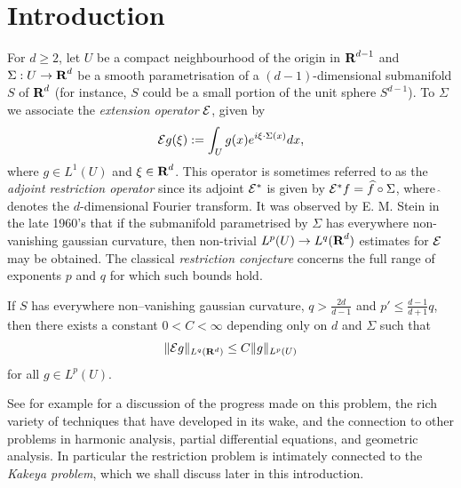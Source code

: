 \section{Introduction}
For $d\geq 2$, let $U$ be a compact neighbourhood of the origin in
${\hbox{\bf R}}^{d-1}$ and $\Sigma :U\rightarrow {\hbox{\bf R}}^{d}$ be a smooth
parametrisation of a $(d-1)$-dimensional submanifold $S$ of
${\hbox{\bf R}}^d$ (for instance, $S$ could be a small portion of the unit sphere $S^{d-1}$).
To $\Sigma$ we associate the \textit{extension operator}
${\mathcal{E}}$, given by
$$
{\mathcal{E}} g(\xi):=\int_{U}g(x)e^{i\xi\cdot\Sigma(x)}dx,
$$
where $g\in L^{1}(U)$ and $\xi\in{\hbox{\bf R}}^d$. This operator is sometimes
referred to as the \textit{adjoint restriction operator} since its
adjoint ${\mathcal{E}}^{*}$ is given by ${\mathcal{E}}^{*}f=\widehat{f}\circ\Sigma$,
where $\widehat{\;}\:$ denotes the $d$-dimensional Fourier
transform. It was observed by E. M. Stein in the late 1960's that
if the submanifold parametrised by $\Sigma$ has everywhere
non-vanishing gaussian curvature, then non-trivial
$L^{p}(U) \to L^{q}({\hbox{\bf R}}^{d})$ estimates for ${\mathcal{E}}$ may be obtained.
The classical \textit{restriction conjecture} concerns the full
range of exponents $p$ and $q$ for which such bounds hold.
\begin{conjecture}\label{LRC}
If $S$ has everywhere non--vanishing gaussian curvature,
$q>\tfrac{2d}{d-1}$ and $p'
\leq\tfrac{d-1}{d+1}q$, then there exists a constant
$0 < C < \infty$ depending only on $d$ and $\Sigma$ such that
\begin{equation*}%
\|\ex g\|_{L^{q}({\bf R}^d)}\leq C\|g\|_{L^{p}(U)}
\end{equation*}
for all $g\in L^p(U)$.
\end{conjecture}
See for
example \cite{TaoRestn} for a discussion of the progress made on
this problem, the rich variety of techniques that have
developed in its wake, and the connection to other problems in harmonic analysis,
partial differential equations, and geometric analysis.  In particular the restriction
problem is intimately connected to the \emph{Kakeya problem}, which we shall discuss later in this
introduction.

